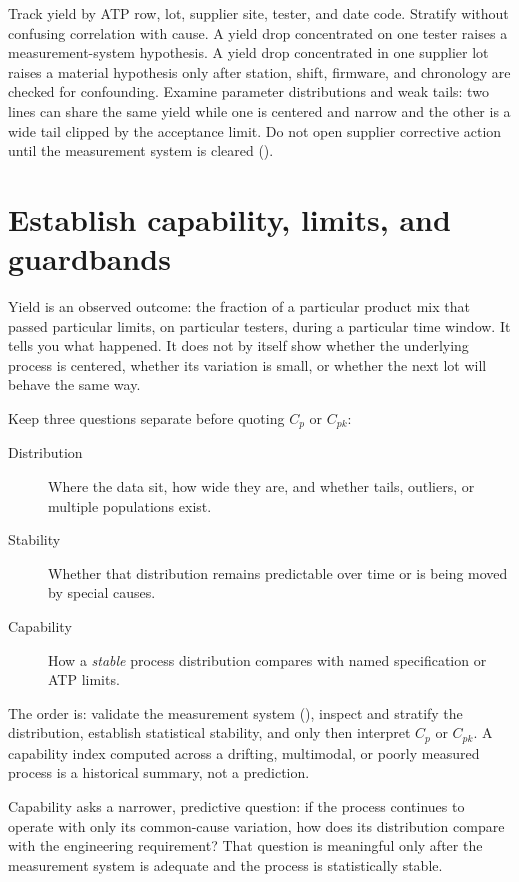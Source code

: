 Track yield by ATP row, lot, supplier site, tester, and date code. Stratify
without confusing correlation with cause. A yield drop concentrated on one
tester raises a measurement-system hypothesis. A yield drop concentrated in one
supplier lot raises a material hypothesis only after station, shift, firmware,
and chronology are checked for confounding. Examine parameter distributions and
weak tails: two lines can share the same yield while one is centered and narrow
and the other is a wide tail clipped by the acceptance limit. Do not open
supplier corrective action until the measurement system is cleared
().

\section{Establish capability, limits, and guardbands}
\label{sec:process-capability}

Yield is an observed outcome: the fraction of a particular product mix that
passed particular limits, on particular testers, during a particular time
window. It tells you what happened. It does not by itself show whether the
underlying process is centered, whether its variation is small, or whether the
next lot will behave the same way.

Keep three questions separate before quoting $C_p$ or $C_{pk}$:

\begin{description}
\item[Distribution] Where the data sit, how wide they are, and whether tails,
      outliers, or multiple populations exist.
\item[Stability] Whether that distribution remains predictable over time or is
      being moved by special causes.
\item[Capability] How a \emph{stable} process distribution compares with named
      specification or ATP limits.
\end{description}

The order is: validate the measurement system
(), inspect and stratify the distribution, establish
statistical stability, and only then interpret $C_p$ or $C_{pk}$. A capability
index computed across a drifting, multimodal, or poorly measured process is a
historical summary, not a prediction.

Capability asks a narrower, predictive question: if the process continues to
operate with only its common-cause variation, how does its distribution compare
with the engineering requirement? That question is meaningful only after the
measurement system is adequate and the process is statistically stable.

